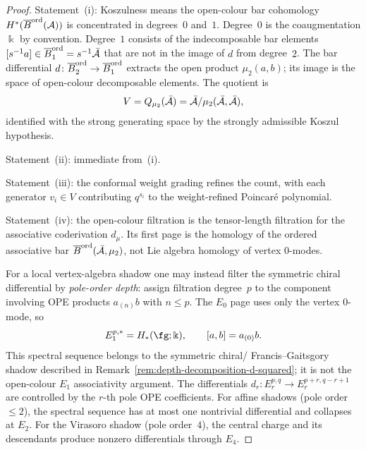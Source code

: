 \begin{proof}
Statement~(i): Koszulness means the open-colour bar cohomology
$H^*(\overline{B}^{\mathrm{ord}}(\mathcal{A}))$ is concentrated
in degrees~$0$ and~$1$. Degree~$0$ is the coaugmentation
$\Bbbk$ by convention. Degree~$1$ consists of the
indecomposable bar elements
$[s^{-1}a]\in\overline{B}^{\mathrm{ord}}_1=s^{-1}\bar{\mathcal{A}}$
that are not in the image of $d$ from degree~$2$. The bar
differential $d\colon\overline{B}^{\mathrm{ord}}_2\to
\overline{B}^{\mathrm{ord}}_1$ extracts the open product \(\mu_2(a,b)\); its image is
the space of open-colour decomposable elements.  The quotient is
\[
V=Q_{\mu_2}(\bar{\mathcal{A}})
  =\bar{\mathcal{A}}/\mu_2(\bar{\mathcal{A}},\bar{\mathcal{A}}),
\]
identified with the strong generating space by the strongly
admissible Koszul hypothesis.

Statement~(ii): immediate from~(i).

Statement~(iii): the conformal weight grading refines
the count, with each generator $v_i\in V$ contributing
$q^{s_i}$ to the weight-refined Poincar\'e polynomial.

Statement~(iv): the open-colour filtration is the tensor-length
filtration for the associative coderivation \(d_\mu\).  Its first
page is the homology of the ordered associative bar
\(\overline{B}^{\mathrm{ord}}(\bar{\mathcal{A}},\mu_2)\), not Lie algebra homology of vertex
\(0\)-modes.

For a local vertex-algebra shadow one may instead filter the
symmetric chiral differential by \emph{pole-order depth}: assign
filtration degree~$p$ to the component involving OPE products
$a_{(n)}b$ with \(n\le p\). The $E_0$ page uses only the vertex
\(0\)-mode, so
\[
E_1^{p,*}=H_*(\fg;\Bbbk),
\qquad [a,b]=a_{(0)}b .
\]
This spectral sequence belongs to the symmetric chiral\slash
Francis--Gaitsgory shadow described in
Remark~\ref{rem:depth-decomposition-d-squared}; it is not the
open-colour \(E_1\) associativity argument.  The differentials
\(d_r\colon E_r^{p,q}\to E_r^{p+r,q-r+1}\) are controlled by the
\(r\)-th pole OPE coefficients. For affine shadows
\textup{(}pole order~\(\le 2\)\textup{)}, the spectral sequence has at
most one nontrivial differential and collapses at \(E_2\). For the
Virasoro shadow \textup{(}pole order~\(4\)\textup{)}, the central
charge and its descendants produce nonzero differentials through
\(E_4\).
\end{proof}


